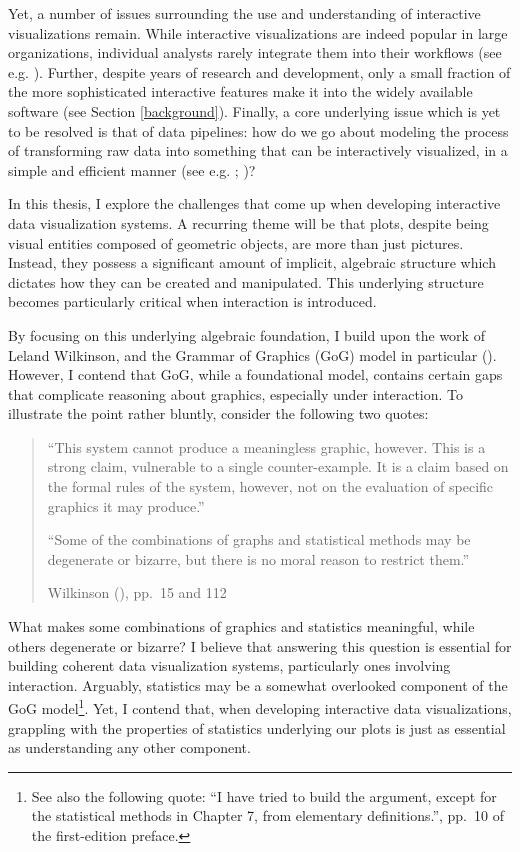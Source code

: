 \documentclass[
  openany]{book}
\theoremstyle{definition}
\theoremstyle{definition}
\theoremstyle{definition}
\theoremstyle{definition}
\theoremstyle{remark}
\begin{document}
Yet, a number of issues surrounding the use and understanding of interactive visualizations remain. While interactive visualizations are indeed popular in large organizations, individual analysts rarely integrate them into their workflows (see e.g. ). Further, despite years of research and development, only a small fraction of the more sophisticated interactive features make it into the widely available software (see Section \ref{background}). Finally, a core underlying issue which is yet to be resolved is that of data pipelines: how do we go about modeling the process of transforming raw data into something that can be interactively visualized, in a simple and efficient manner (see e.g. ; )?

In this thesis, I explore the challenges that come up when developing interactive data visualization systems. A recurring theme will be that plots, despite being visual entities composed of geometric objects, are more than just pictures. Instead, they possess a significant amount of implicit, algebraic structure which dictates how they can be created and manipulated. This underlying structure becomes particularly critical when interaction is introduced.

By focusing on this underlying algebraic foundation, I build upon the work of Leland Wilkinson, and the Grammar of Graphics (GoG) model in particular (). However, I contend that GoG, while a foundational model, contains certain gaps that complicate reasoning about graphics, especially under interaction. To illustrate the point rather bluntly, consider the following two quotes:

\begin{quote}
``This system cannot produce a meaningless graphic, however. This is a strong claim, vulnerable to a single counter-example. It is a claim based on the formal rules of the system, however, not on the evaluation of specific graphics it may produce.''

``Some of the combinations of graphs and statistical methods may be degenerate or bizarre, but there is no moral reason to restrict them.''

Wilkinson (), pp.~15 and 112
\end{quote}

What makes some combinations of graphics and statistics meaningful, while others degenerate or bizarre? I believe that answering this question is essential for building coherent data visualization systems, particularly ones involving interaction. Arguably, statistics may be a somewhat overlooked component of the GoG model\footnote{See also the following quote: ``I have tried to build the argument, except for the statistical methods in Chapter 7, from elementary definitions.'', pp.~10 of the first-edition preface.}. Yet, I contend that, when developing interactive data visualizations, grappling with the properties of statistics underlying our plots is just as essential as understanding any other component.
\end{document}
